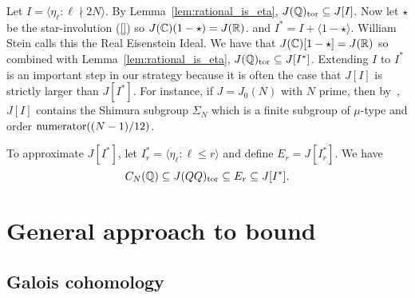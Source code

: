 Let $I= \langle \eta_\ell:\ell\nmid 2N \rangle$. By
Lemma~\ref{lem:rational_is_eta}, $J(\mathbb{Q})_{\mathrm{tor}}\subseteq J[I]$. Now let $\star$
be the star-involution (\ref{}) so $J(\mathbb{C})(1-\star)=J(\mathbb{R})$. and $I^*=I +
\langle 1-\star \rangle$. William Stein calls this the Real Eisenstein Ideal.
We have that $J(\mathbb{C})[1-\star]=J(\mathbb{R})$ so combined with
Lemma~\ref{lem:rational_is_eta}, $J(\mathbb{Q})_{\mathrm{tor}}\subseteq J[I^*]$. Extending $I$
to $I^*$ is an important step in our strategy because it is often the case that
$J[I]$ is strictly larger than $J[I^*]$. For instance, if $J=J_0(N)$ with $N$
prime, then by~\cite[Cor. 16.3]{mazur:eisenstein}, $J[I]$ contains the Shimura
subgroup $\Sigma_N$ which is a finite subgroup of $\mu$-type and order
$\operatorname{numerator}((N-1)/12)$.

To approximate $J[I^*]$, let $I_r ^* = \langle \eta_\ell:\ell\leq r \rangle$
and define $E_r = J[I_r ^*]$.
We have
\begin{equation}%
    \label{eq:eta_equation}
    C_N(\QQ)\subseteq J(QQ)_\tor \subseteq E_r \subseteq J[I^*].
\end{equation}

\section{General approach to bound}%
\label{sec:galois_cohomology_bounds}

\subsection{Galois cohomology}%
\label{sub:galois_cohomology}

